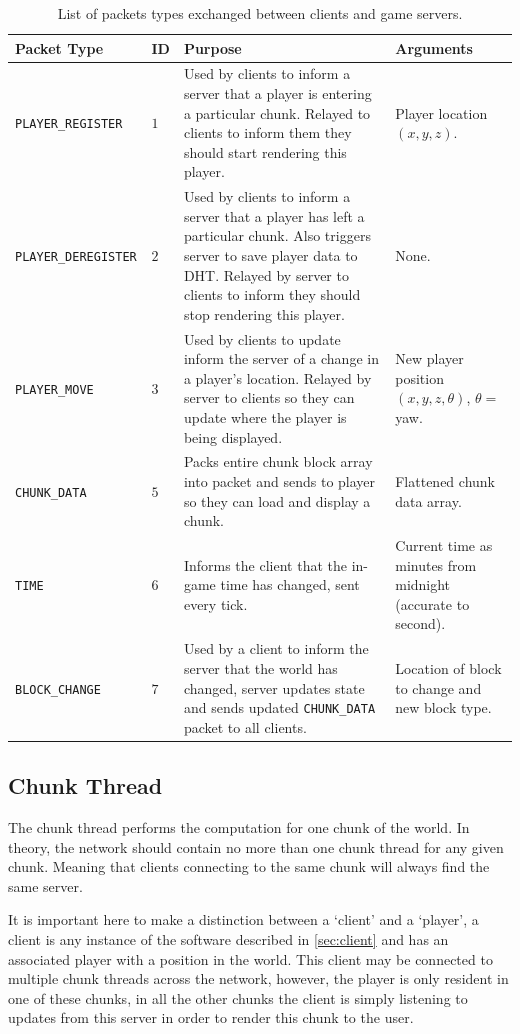\documentclass[12pt,notitlepage,a4paper]{report}
\begin{document}
	\begin{table}
		\begin{tabularx}{\textwidth}{| l | l | X | p{2cm} |}
			\hline
			\bf Packet Type & \bf ID & \bf Purpose & \bf Arguments \\
			\hline
			\tt PLAYER\_REGISTER & $1$ & Used by clients to inform a server that a player is entering a particular chunk. Relayed to clients to inform them they should start rendering this player. & Player location $(x,y,z)$. \\
			\hline
			\tt PLAYER\_DEREGISTER & $2$ & Used by clients to inform a server that a player has left a particular chunk. Also triggers server to save player data to DHT. Relayed by server to clients to inform they should stop rendering this player. & None. \\
			\hline
			\tt PLAYER\_MOVE & $3$ & Used by clients to update inform the server of a change in a player's location. Relayed by server to clients so they can update where the player is being displayed. & New player position $(x,y,z,\theta)$, $\theta=$ yaw. \\
			\hline
			\tt CHUNK\_DATA & $5$ & Packs entire chunk block array into packet and sends to player so they can load and display a chunk. & Flattened chunk data array. \\
			\hline
			\tt TIME & $6$ & Informs the client that the in-game time has changed, sent every tick. & Current time as minutes from midnight (accurate to second). \\
			\hline
			\tt BLOCK\_CHANGE & $7$ & Used by a client to inform the server that the world has changed, server updates state and sends updated \texttt{CHUNK\_DATA} packet to all clients. & Location of block to change and new block type. \\
			\hline
		\end{tabularx}
		\caption{List of packets types exchanged between clients and game servers.}
		\label{tab:gamepackets}
	\end{table}
	
	\subsection{Chunk Thread}
	\label{sec:cthread}
	The chunk thread performs the computation for one chunk of the world. In theory, the network should contain no more than one chunk thread for any given chunk. Meaning that clients connecting to the same chunk will always find the same server.
	
	It is important here to make a distinction between a `client' and a `player', a client is any instance of the software described in \cref{sec:client} and has an associated player with a position in the world. This client may be connected to multiple chunk threads across the network, however, the player is only resident in one of these chunks, in all the other chunks the client is simply listening to updates from this server in order to render this chunk to the user.
	
\end{document}
